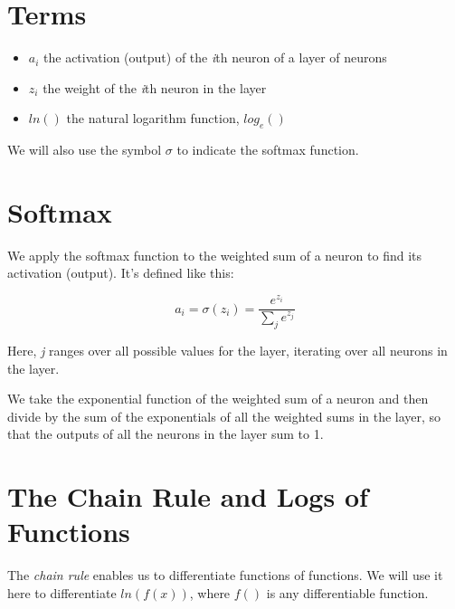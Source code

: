 \documentclass[12pt]{article}
\begin{document}
\maketitle

\begin{abstract}

\end{abstract}

\section{Terms}

\begin{itemize}
\item[] $a_i$ the activation (output) of the \textit{i}th neuron of a layer of neurons
\item[] $z_i$ the weight of the \textit{i}th neuron in the layer 
\item[] $ln()$ the natural logarithm function, $log_e()$  
\end{itemize}

We will also use the symbol $\sigma$ to indicate the softmax function.

\section{Softmax}

We apply the softmax function to the weighted sum of a neuron to find its activation (output). It's defined like this:

\begin{equation} \label{eq:softmax}
a_i = \sigma(z_i) = \frac{e^{z_i}}{ \sum_{j} e^{z_j} }
\end{equation}

Here, \textit{j} ranges over all possible values for the layer, iterating over all neurons in the layer.

We take the exponential function of the weighted sum of a neuron and then divide by the sum of the exponentials of all the weighted sums in the layer, so that the outputs of all the neurons in the layer sum to 1.

\section{The Chain Rule and Logs of Functions}

The \textit{chain rule} enables us to differentiate functions of functions. We will use it here to differentiate $ln(f(x))$, where $f()$ is any differentiable function.
\bigskip
\end{document}

